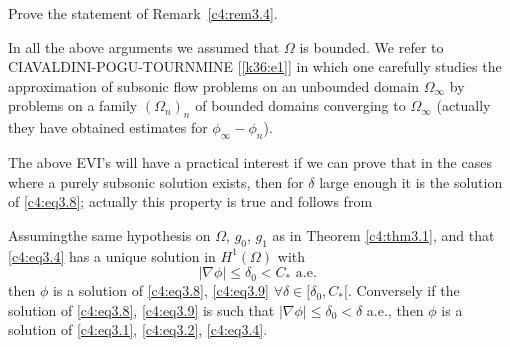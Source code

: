 \begin{exercise}\label{c4:exer3.2}%
Prove the statement of Remark~\ref{c4:rem3.4}.
\end{exercise}
\begin{remark}\label{c4:rem3.5}%
In all the above arguments we assumed that $\Omega$ is boun\-ded. We
refer to CIAVALDINI-POGU-TOURNMINE [\ref{k36:e1}] in which one carefully studies
the approximation of subsonic flow problems on an unbounded domain
$\Omega_\infty$ by problems on a family $(\Omega_n)_n$ of bounded
domains converging to $\Omega_\infty$ (actually they have obtained
estimates for $\phi_\infty -\phi_n$). 
\end{remark}

The above EVI's will have a practical interest if we can prove that in
the cases where a purely subsonic solution exists, then for $\delta$
large enough it is the solution of \eqref{c4:eq3.8}; actually this
property is true and follows from  

\begin{theorem}\label{c4:thm3.2}%
Assuming\pageoriginale  the same hypothesis on $\Omega$, $g_0$, $g_1$
as in Theorem \ref{c4:thm3.1}, and that \eqref{c4:eq3.4} has a unique
solution in $H^1(\Omega)$ with  
\begin{equation}
|\nabla \phi| \leq \delta _0 < C_* \text{ a.e. } \tag{3.14}\label{c4:eq3.14}
\end{equation}
then $\phi$ is a solution of \eqref{c4:eq3.8}, \eqref{c4:eq3.9}
$\forall \delta \in [\delta_0, C_*[$. Conversely if the solution of
    \eqref{c4:eq3.8}, \eqref{c4:eq3.9} is such that $|\nabla
    \phi| \leq \delta_0 < \delta$ a.e., then $\phi$ is a solution of
    \eqref{c4:eq3.1}, \eqref{c4:eq3.2}, \eqref{c4:eq3.4}. 
\end{theorem}


